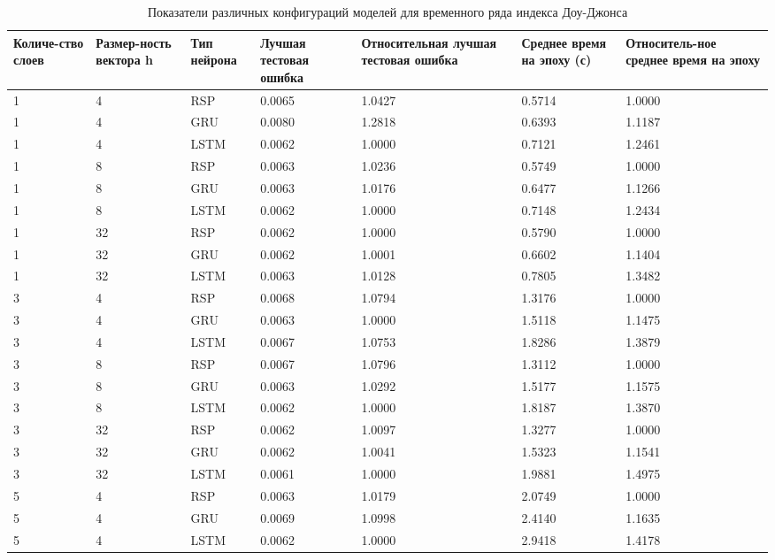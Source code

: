 \documentclass[11pt]{article}
\begin{document}
\begin{table}[H]
\caption{Показатели различных конфигураций моделей для временного ряда индекса Доу-Джонса}
\begin{tabular}{|p{1.4cm}|p{1.4cm}|p{1.4cm}|p{1.5cm}|p{2.5cm}|p{1.9cm}|p{2cm}|}
\hline
Количе-ство слоев &  Размер-ность вектора h & Тип нейрона & Лучшая тестовая ошибка & Относительная лучшая тестовая ошибка & Среднее время на эпоху (с) & Относитель-ное среднее время на эпоху \\
\hline
 1 &   4 &   RSP & 0.0065 & 1.0427 & 0.5714 &  1.0000 \\
\hline
 1 &   4 &   GRU & 0.0080 & 1.2818 & 0.6393 &  1.1187 \\
\hline
 1 &   4 &  LSTM & 0.0062 & 1.0000 & 0.7121 &  1.2461 \\
\hline
 1 &   8 &   RSP & 0.0063 & 1.0236 & 0.5749 &  1.0000 \\
\hline
 1 &   8 &   GRU & 0.0063 & 1.0176 & 0.6477 &  1.1266 \\
\hline
 1 &   8 &  LSTM & 0.0062 & 1.0000 & 0.7148 &  1.2434 \\
\hline
 1 &  32 &   RSP & 0.0062 & 1.0000 & 0.5790 &  1.0000 \\
\hline
 1 &  32 &   GRU & 0.0062 & 1.0001 & 0.6602 &  1.1404 \\
\hline
 1 &  32 &  LSTM & 0.0063 & 1.0128 & 0.7805 &  1.3482 \\
\hline
 3 &   4 &   RSP & 0.0068 & 1.0794 & 1.3176 &  1.0000 \\
\hline
 3 &   4 &   GRU & 0.0063 & 1.0000 & 1.5118 &  1.1475 \\
\hline
 3 &   4 &  LSTM & 0.0067 & 1.0753 & 1.8286 &  1.3879 \\
\hline
 3 &   8 &   RSP & 0.0067 & 1.0796 & 1.3112 &  1.0000 \\
\hline
 3 &   8 &   GRU & 0.0063 & 1.0292 & 1.5177 &  1.1575 \\
\hline
 3 &   8 &  LSTM & 0.0062 & 1.0000 & 1.8187 &  1.3870 \\
\hline
 3 &  32 &   RSP & 0.0062 & 1.0097 & 1.3277 &  1.0000 \\
\hline
 3 &  32 &   GRU & 0.0062 & 1.0041 & 1.5323 &  1.1541 \\
\hline
 3 &  32 &  LSTM & 0.0061 & 1.0000 & 1.9881 &  1.4975 \\
\hline
 5 &   4 &   RSP & 0.0063 & 1.0179 & 2.0749 &  1.0000 \\
\hline
 5 &   4 &   GRU & 0.0069 & 1.0998 & 2.4140 &  1.1635 \\
\hline
 5 &   4 &  LSTM & 0.0062 & 1.0000 & 2.9418 &  1.4178 \\

\end{tabular}
\end{table}
\end{document}
